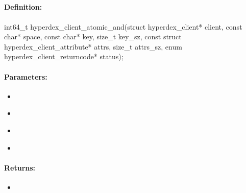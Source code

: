 \pagebreak
\subsection{}
\label{api:c:atomic_and}


\paragraph{Definition:}
\begin{ccode}
int64_t hyperdex_client_atomic_and(struct hyperdex_client* client,
        const char* space,
        const char* key, size_t key_sz,
        const struct hyperdex_client_attribute* attrs, size_t attrs_sz,
        enum hyperdex_client_returncode* status);
\end{ccode}

\paragraph{Parameters:}
\begin{itemize}[noitemsep]
\item {}\\

\item {}\\

\item {}\\

\item {}\\

\end{itemize}

\paragraph{Returns:}
\begin{itemize}[noitemsep]
\item {}\\

\end{itemize}

